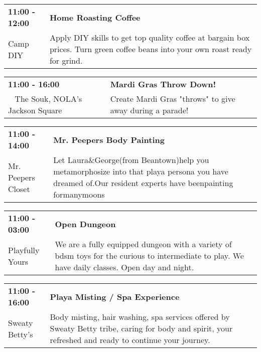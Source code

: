 \begin{tabular}{ p{1in} p{2.2in} }
    \textbf{11:00 - 12:00} & \textbf{Home Roasting Coffee} \\
    Camp DIY \newline  & Apply DIY skills to get top quality coffee at bargain box prices.  Turn green coffee beans into your own roast ready for grind. \\
    \hline 
\end{tabular}
    
\begin{tabular}{ p{1in} p{2.2in} }
    \textbf{11:00 - 16:00} & \textbf{Mardi Gras Throw Down!} \\
    ~ \newline The Souk, NOLA's Jackson Square  & Create Mardi Gras "throws" to give away during a parade! \\
    \hline 
\end{tabular}
    
\begin{tabular}{ p{1in} p{2.2in} }
    \textbf{11:00 - 14:00} & \textbf{Mr. Peepers Body Painting} \\
    Mr. Peepers Closet \newline  & Let Laura\&George(from Beantown)help you metamorphosize into that playa persona you have dreamed of.Our resident experts have beenpainting formanymoons \\
    \hline 
\end{tabular}
    
\begin{tabular}{ p{1in} p{2.2in} }
    \textbf{11:00 - 03:00} & \textbf{Open Dungeon} \\
    Playfully Yours \newline  & We are a fully equipped dungeon with a variety of bdsm toys for the curious to intermediate to play. We have daily classes. Open day and night. \\
    \hline 
\end{tabular}
    
\begin{tabular}{ p{1in} p{2.2in} }
    \textbf{11:00 - 16:00} & \textbf{Playa Misting / Spa Experience} \\
    Sweaty  Betty's \newline  & Body misting, hair washing, spa services offered by Sweaty Betty tribe, caring for body and spirit, your refreshed and ready to continue your journey. \\
    \hline 
\end{tabular}
    
